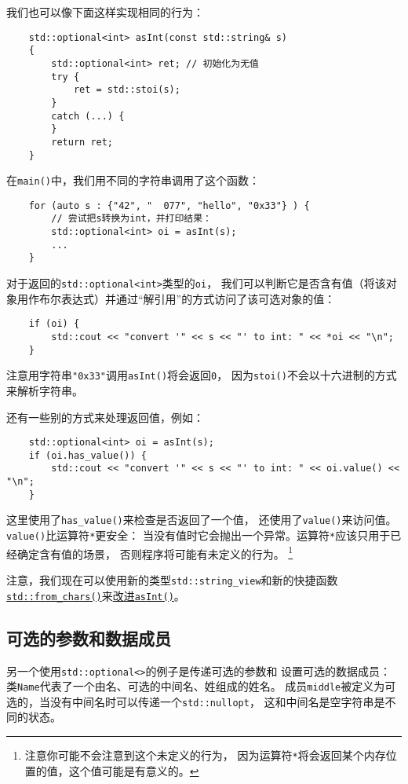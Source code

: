 我们也可以像下面这样实现相同的行为：
\begin{lstlisting}
    std::optional<int> asInt(const std::string& s)
    {
        std::optional<int> ret; // 初始化为无值
        try {
            ret = std::stoi(s);
        }
        catch (...) {
        }
        return ret;
    }
\end{lstlisting}
在\texttt{main()}中，我们用不同的字符串调用了这个函数：
\begin{lstlisting}
    for (auto s : {"42", "  077", "hello", "0x33"} ) {
        // 尝试把s转换为int，并打印结果：
        std::optional<int> oi = asInt(s);
        ...
    }
\end{lstlisting}
对于返回的\texttt{std::optional<int>}类型的\texttt{oi}，
我们可以判断它是否含有值（将该对象用作布尔表达式）并通过“解引用”的方式访问了该可选对象的值：
\begin{lstlisting}
    if (oi) {
        std::cout << "convert '" << s << "' to int: " << *oi << "\n";
    }
\end{lstlisting}
注意用字符串\texttt{"0x33"}调用\texttt{asInt()}将会返回\texttt{0}，
因为\texttt{stoi()}不会以十六进制的方式来解析字符串。

还有一些别的方式来处理返回值，例如：
\begin{lstlisting}
    std::optional<int> oi = asInt(s);
    if (oi.has_value()) {
        std::cout << "convert '" << s << "' to int: " << oi.value() << "\n";
    }
\end{lstlisting}
这里使用了\texttt{has\_value()}来检查是否返回了一个值，
还使用了\texttt{value()}来访问值。\texttt{value()}比运算符\texttt{*}更安全：
当没有值时它会抛出一个异常。运算符\texttt{*}应该只用于已经确定含有值的场景，
否则程序将可能有未定义的行为。
\footnote{注意你可能不会注意到这个未定义的行为，
因为运算符\texttt{*}将会返回某个内存位置的值，这个值可能是有意义的。}

注意，我们现在可以使用新的类型\texttt{std::string\_view}和新的快捷函数\hyperref[ch31.2.1]
{\texttt{std::from\_chars()}}来\hyperref[改进asInt]{改进\texttt{asInt()}}。

\subsection{可选的参数和数据成员}
另一个使用\texttt{std::optional<>}的例子是传递可选的参数和
设置可选的数据成员：
类\texttt{Name}代表了一个由名、可选的中间名、姓组成的姓名。
成员\texttt{middle}被定义为可选的，当没有中间名时可以传递一个\texttt{std::nullopt}，
这和中间名是空字符串是不同的状态。

